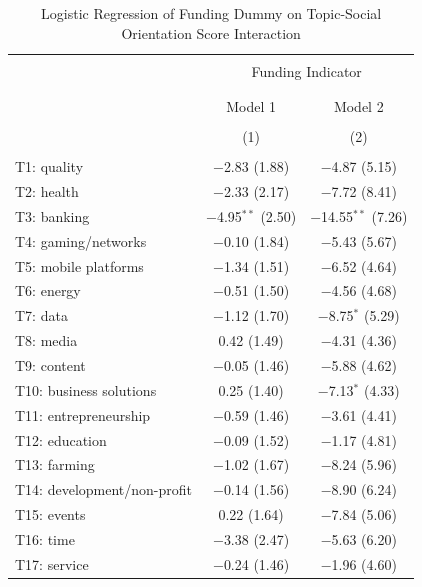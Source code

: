 \documentclass[12pt]{article}
\begin{document}
\begin{table}[!htbp] \centering 
  \caption{Logistic Regression of Funding Dummy on Topic-Social Orientation Score Interaction} 
  \label{} 
\footnotesize 
\begin{tabular}{@{\extracolsep{5pt}}lcc} 
\\[-1.8ex]\hline 
\hline \\[-1.8ex] 
 & \multicolumn{2}{c}{Funding Indicator} \\ 
\cline{2-3} 
\\[-1.8ex] & \multicolumn{2}{c}{} \\ 
 & Model 1 & Model 2 \\ 
\\[-1.8ex] & (1) & (2)\\ 
\hline \\[-1.8ex] 
 T1: quality & $-$2.83 (1.88) & $-$4.87 (5.15) \\ 
  T2: health & $-$2.33 (2.17) & $-$7.72 (8.41) \\ 
  T3: banking & $-$4.95$^{**}$ (2.50) & $-$14.55$^{**}$ (7.26) \\ 
  T4: gaming/networks & $-$0.10 (1.84) & $-$5.43 (5.67) \\ 
  T5: mobile platforms & $-$1.34 (1.51) & $-$6.52 (4.64) \\ 
  T6: energy & $-$0.51 (1.50) & $-$4.56 (4.68) \\ 
  T7: data & $-$1.12 (1.70) & $-$8.75$^{*}$ (5.29) \\ 
  T8: media & 0.42 (1.49) & $-$4.31 (4.36) \\ 
  T9: content & $-$0.05 (1.46) & $-$5.88 (4.62) \\ 
  T10: business solutions & 0.25 (1.40) & $-$7.13$^{*}$ (4.33) \\ 
  T11: entrepreneurship & $-$0.59 (1.46) & $-$3.61 (4.41) \\ 
  T12: education & $-$0.09 (1.52) & $-$1.17 (4.81) \\ 
  T13: farming & $-$1.02 (1.67) & $-$8.24 (5.96) \\ 
  T14: development/non-profit & $-$0.14 (1.56) & $-$8.90 (6.24) \\ 
  T15: events & 0.22 (1.64) & $-$7.84 (5.06) \\ 
  T16: time & $-$3.38 (2.47) & $-$5.63 (6.20) \\ 
  T17: service & $-$0.24 (1.46) & $-$1.96 (4.60) \\ 

\end{tabular}
\end{table}
\end{document}
